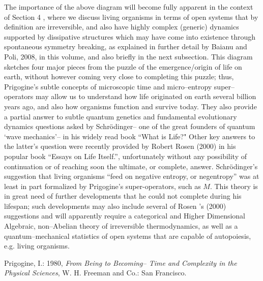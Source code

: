 \documentclass[12pt]{article}
\theoremstyle{plain}
\theoremstyle{definition}
\theoremstyle{plain}
\numberwithin{equation}{section}
\begin{document}
The importance of the above diagram will become fully apparent in the context of Section 4 , where we discuss living organisms in terms of open systems that by definition are irreversible, and also have highly complex (generic) dynamics supported by dissipative structures which may have come into existence through spontaneous symmetry breaking, as explained in further detail by Baianu and Poli, 2008, in this volume, and also briefly in the next subsection. This diagram sketches four major pieces from the puzzle of the emergence/origin of life on earth, without however coming very close to completing this puzzle; thus, Prigogine's subtle concepts of  microscopic time and micro--entropy super--operators may allow us to understand how life originated on earth several billion years ago, and also how organisms function and survive today.  They also provide a partial answer to subtle quantum genetics and fundamental evolutionary dynamics questions asked by Schr\"{o}dinger-- one of the great founders of quantum `wave mechanics'-- in his widely read book ``What is Life?" Other key answers to the latter's question were recently provided by Robert Rosen (2000) in his popular book ``Essays on Life Itself.'', unfortunately without any possibility of continuation or of reaching soon the ultimate, or complete, answer. Schr\"{o}dinger's suggestion that living organisms ``feed on negative entropy, or negentropy'' was at least in part formalized by Prigogine's super-operators, such as $M$. This theory is in great need of further developments that he could not complete during his lifespan; such developments may also include several of Rosen 's (2000) suggestions and will apparently require a categorical and Higher Dimensional Algebraic, non--Abelian theory of irreversible thermodynamics, as well as a quantum--mechanical statistics of open systems that are capable of autopoiesis, e.g. living organisms.    


\begin{thebibliography}{9}
Prigogine, I.: 1980, \emph{From Being to Becoming-- Time and Complexity in the Physical Sciences}, W. H. Freeman and Co.:  San Francisco.

\end{thebibliography}

\end{document}

